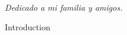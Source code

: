 \documentclass[a4paper,justified,titlepage.nobib]{tufte-book}
\begin{document}

\tableofcontents %


\listoffigures %


\listoftables %


\cleardoublepage
~\vfill
\begin{doublespace}
\noindent\fontsize{18}{22}\selectfont\itshape
\nohyphenation
Dedicado a mi familia y amigos.
\end{doublespace}
\vfill
\vfill


\mainmatter

{Introduction}
\cleardoublepage






\end{document}
